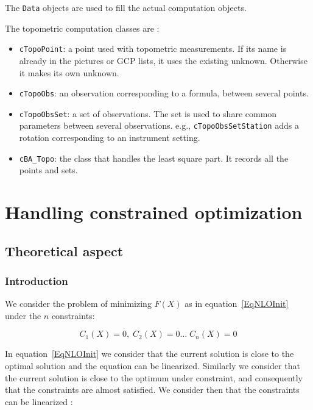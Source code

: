 The \texttt{Data} objects are used to fill the actual computation objects.

The topometric computation classes are :
 \begin{itemize}
    \item \texttt{cTopoPoint}: a point used with topometric measurements. If its name is already in the pictures or GCP lists, it uses the existing unknown. Otherwise it makes its own unknown. 
    \item \texttt{cTopoObs}: an observation corresponding to a formula, between several points.
    \item \texttt{cTopoObsSet}: a set of observations. The set is used to share common parameters between several observations. e.g., \texttt{cTopoObsSetStation} adds a rotation corresponding to an instrument setting.   
    \item \texttt{cBA\_Topo}: the class that handles the least square part. It records all the points and sets.
 \end{itemize}


\section{Handling constrained optimization}


\subsection{Theoretical aspect}


\subsubsection{Introduction}

We consider the problem of minimizing $F(X)$ as in equation~\ref{EqNLOInit} under
the $n$ constraints:

\begin{equation}
	C_1(X) =0, \; C_2(X)=0 \dots \;  C_n(X)=0
\end{equation}

In  equation~\ref{EqNLOInit} we consider that the current solution is
close to the optimal solution and the equation can be linearized.
Similarly we consider that the current solution is close to the 
optimum under constraint, and consequently that the constraints are almost satisfied.
We consider then that the constraints can be linearized :

